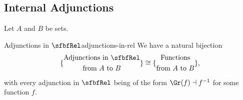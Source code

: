 \subsection{Internal Adjunctions}\label{subsection-internal-adjunctions-in-rel}
Let $A$ and $B$ be sets.
\begin{proposition}{Adjunctions in $\sfbfRel$}{adjunctions-in-rel}%
    We have a natural bijection
    \[
        \{
            \begin{gathered}
                \text{Adjunctions in $\sfbfRel$}\\
                \text{from $A$ to $B$}
            \end{gathered}
        \}%
        \cong
        \{
            \begin{gathered}
                \text{Functions}\\
                \text{from $A$ to $B$}
            \end{gathered}
        \},
    \]%
    with every adjunction in $\sfbfRel$ being of the form $\Gr(f)\dashv f^{-1}$ for some function $f$.
\end{proposition}
